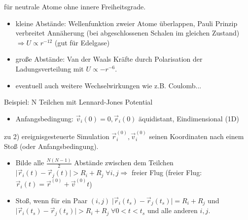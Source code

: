 \documentclass[12pt]{article}
\begin{document}
für neutrale Atome ohne innere Freiheitsgrade. 
\begin{itemize}
\item kleine Abstände: Wellenfunktion zweier Atome überlappen, Pauli Prinzip verbreitet Annäherung (bei abgeschlossenen Schalen im gleichen Zustand) $\Rightarrow U \propto r^{-12}$ (gut für Edelgase) \\
\item große Abstände: Van der Waals Kräfte durch Polarisation der Ladungsverteilung mit $U \propto - r^{-6}$.
\item eventuell auch weitere Wechselwirkungen wie z.B. Coulomb...
\end{itemize}
Beispiel: N Teilchen mit Lennard-Jones Potential
\begin{itemize}
\item Anfangsbedingung: $\vec{v}_i (0)=0, \vec{r}_i (0)$ äquidistant, Eindimensional (1D) 
\end{itemize}
zu 2) ereignisgesteuerte Simulation
$\vec{r}_i^{(0)}, \vec{v}_i^{(0)}$ seinen Koordinaten nach einem Stoß (oder Anfangsbedingung).
\begin{itemize}
\item Bilde alle $\frac{N(N-1)}{2}$ Abstände zwischen dem Teilchen $ \vert \vec{r}_i (t) - \vec{r}_j (t) \vert > R_i + R_j \; \forall i,j \Rightarrow$ freier Flug (freier Flug: $\vec{r}_i (t) = \vec{r}^{(0)} + \vec{v}^{(0)} t$)
\item Stoß, wenn für ein Paar $(i,j) \; \vert \vec{r}_i (t_s) - \vec{r}_j (t_s) \vert = R_i + R_j $ und $ \vert \vec{r}_i (t_s) - \vec{r}_j (t_s) \vert > R_i + R_j \; \forall 0< t < t_s $ und alle anderen $i,j$.
\end{itemize}
\end{document}
